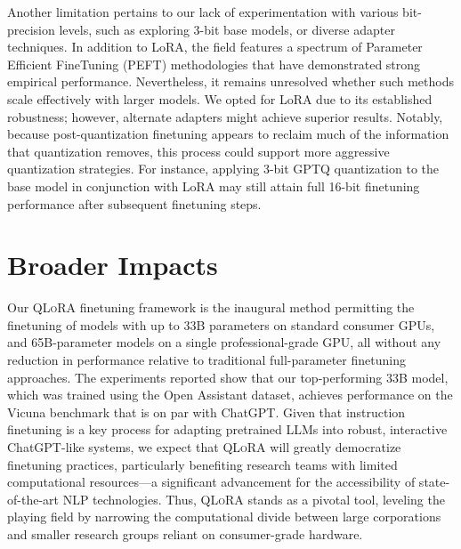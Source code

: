 Another limitation pertains to our lack of experimentation with various bit-precision levels, such as exploring 3-bit base models, or diverse adapter techniques. In addition to LoRA, the field features a spectrum of Parameter Efficient FineTuning (PEFT) methodologies that have demonstrated strong empirical performance. Nevertheless, it remains unresolved whether such methods scale effectively with larger models. We opted for LoRA due to its established robustness; however, alternate adapters might achieve superior results. Notably, because post-quantization finetuning appears to reclaim much of the information that quantization removes, this process could support more aggressive quantization strategies. For instance, applying 3-bit GPTQ quantization to the base model in conjunction with LoRA may still attain full 16-bit finetuning performance after subsequent finetuning steps.

\section{Broader Impacts}

Our \textsc{QLoRA} finetuning framework is the inaugural method permitting the finetuning of models with up to 33B parameters on standard consumer GPUs, and 65B-parameter models on a single professional-grade GPU, all without any reduction in performance relative to traditional full-parameter finetuning approaches. The experiments reported show that our top-performing 33B model, which was trained using the Open Assistant dataset, achieves performance on the Vicuna benchmark that is on par with ChatGPT. Given that instruction finetuning is a key process for adapting pretrained LLMs into robust, interactive ChatGPT-like systems, we expect that \textsc{QLoRA} will greatly democratize finetuning practices, particularly benefiting research teams with limited computational resources—a significant advancement for the accessibility of state-of-the-art NLP technologies. Thus, \textsc{QLoRA} stands as a pivotal tool, leveling the playing field by narrowing the computational divide between large corporations and smaller research groups reliant on consumer-grade hardware.

